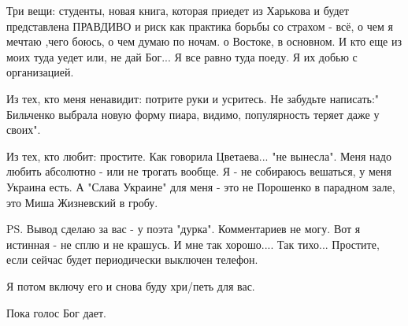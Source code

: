 Три вещи: студенты, новая книга, которая приедет из Харькова и будет
представлена ПРАВДИВО и риск как практика борьбы со страхом - всё, о чем я
мечтаю ,чего боюсь, о чем думаю по ночам.  о Востоке, в основном. И кто еще из
моих туда уедет или, не дай Бог... Я все равно туда поеду. Я их добью с
организацией. 

Из тех, кто меня ненавидит: потрите руки и усритесь. Не забудьте написать:"
Бильченко  выбрала новую форму пиара, видимо, популярность теряет даже у
своих".

Из тех, кто любит: простите. Как говорила Цветаева... "не вынесла". Меня надо
любить абсолютно - или не трогать вообще. Я - не собираюсь вешаться, у меня
Украина есть. А "Слава Украине" для меня - это не Порошенко в парадном зале,
это Миша Жизневский в гробу.

PS. Вывод сделаю за вас - у поэта "дурка". Комментариев не могу. Вот я истинная
- не сплю и не крашусь. И мне так хорошо.... Так тихо... Простите, если сейчас
будет периодически выключен телефон. 

Я потом включу его и снова буду хри/петь для вас. 

Пока голос Бог дает.

